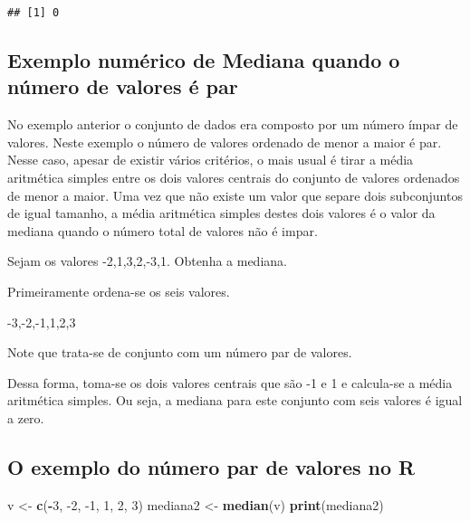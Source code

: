 \documentclass[
]{book}
\newenvironment{Shaded}{\begin{snugshade}}{\end{snugshade}}
\newcommand{\DecValTok}[1]{\textcolor[rgb]{0.00,0.00,0.81}{#1}}
\newcommand{\KeywordTok}[1]{\textcolor[rgb]{0.13,0.29,0.53}{\textbf{#1}}}
\newcommand{\NormalTok}[1]{#1}
\newcommand{\OperatorTok}[1]{\textcolor[rgb]{0.81,0.36,0.00}{\textbf{#1}}}
\newcommand{\StringTok}[1]{\textcolor[rgb]{0.31,0.60,0.02}{#1}}
\begin{document}
\begin{verbatim}
## [1] 0
\end{verbatim}

\hypertarget{exemplo-numuxe9rico-de-mediana-quando-o-nuxfamero-de-valores-uxe9-par}{%
\subsection{Exemplo numérico de Mediana quando o número de valores é par}\label{exemplo-numuxe9rico-de-mediana-quando-o-nuxfamero-de-valores-uxe9-par}}

No exemplo anterior o conjunto de dados era composto por um número ímpar de valores. Neste exemplo o número de valores ordenado de menor a maior é par. Nesse caso, apesar de existir vários critérios, o mais usual é tirar a média aritmética simples entre os dois valores centrais do conjunto de valores ordenados de menor a maior. Uma vez que não existe um valor que separe dois subconjuntos de igual tamanho, a média aritmética simples destes dois valores é o valor da mediana quando o número total de valores não é impar.

Sejam os valores -2,1,3,2,-3,1. Obtenha a mediana.

Primeiramente ordena-se os seis valores.

-3,-2,-1,1,2,3

Note que trata-se de conjunto com um número par de valores.

Dessa forma, toma-se os dois valores centrais que são -1 e 1 e calcula-se a média aritmética simples. Ou seja, a mediana para este conjunto com seis valores é igual a zero.

\hypertarget{o-exemplo-do-nuxfamero-par-de-valores-no-r}{%
\subsection{O exemplo do número par de valores no R}\label{o-exemplo-do-nuxfamero-par-de-valores-no-r}}

\begin{Shaded}
\begin{Highlighting}[]
\NormalTok{v <-}\StringTok{ }\KeywordTok{c}\NormalTok{(}\OperatorTok{-}\DecValTok{3}\NormalTok{, }\DecValTok{-2}\NormalTok{, }\DecValTok{-1}\NormalTok{, }\DecValTok{1}\NormalTok{, }\DecValTok{2}\NormalTok{, }\DecValTok{3}\NormalTok{)}
\NormalTok{mediana2 <-}\StringTok{ }\KeywordTok{median}\NormalTok{(v)}
\KeywordTok{print}\NormalTok{(mediana2)}
\end{Highlighting}
\end{Shaded}
\end{document}
